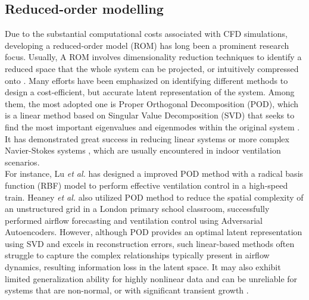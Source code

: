 \documentclass[final-report]{article-template}
\begin{document}
\subsection{Reduced-order modelling}
Due to the substantial computational costs associated with CFD simulations, developing a reduced-order model (ROM) has long been a prominent research focus. Usually, A ROM involves dimensionality reduction techniques to identify a reduced space that the whole system can be projected, or intuitively compressed onto \cite{Bhattacharyya21, Menier2023CDROM}. Many efforts have been emphasized on identifying different methods to design a cost-efficient, but accurate latent representation of the system. Among them, the most adopted one is Proper Orthogonal Decomposition (POD), which is a linear method based on Singular Value Decomposition (SVD) that seeks to find the most important eigenvalues and eigenmodes within the original system \cite{dowell2023reduced}. It has demonstrated great success in reducing linear systems or more complex Navier-Stokes systems \cite{Menier2023CDROM, berkooz1993proper}, which are usually encountered in indoor ventilation scenarios.\\ 

For instance, Lu \textit{et al.} \cite{lu2023efficient} has designed a improved POD method with a radical basis function (RBF) model to perform effective ventilation control in a high-speed train. Heaney \textit{et al.} \cite{heaney2024data} also utilized POD method to reduce the spatial complexity of an unstructured grid in a London primary school classroom, successfully performed airflow forecasting and ventilation control using Adversarial Autoencoders. However, although POD provides an optimal latent representation using SVD and excels in reconstruction errors, such linear-based methods often struggle to capture the complex relationships typically present in airflow dynamics, resulting information loss in the latent space. It may also exhibit limited generalization ability for highly nonlinear data and can be unreliable for systems that are non-normal, or with significant transient growth \cite{rowley2017model}. \\
\end{document}
